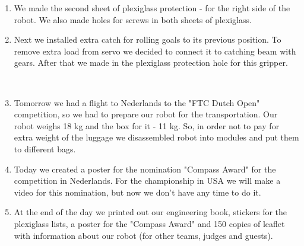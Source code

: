\begin{enumerate}
\begin{enumerate}
	   \item We made the second sheet of plexiglass protection - for the right side of the robot. We also made holes for screws in both sheets of plexiglass.
	   
	   \item Next we installed extra catch for rolling goals to its previous position. To remove extra load from servo we decided to connect it to catching beam with gears. After that we made in the plexiglass protection hole for this gripper.
	   \begin{figure}[H]
	   	\begin{minipage}[h]{0.2\linewidth}
	   		\center  
	   	\end{minipage}
	   	\begin{minipage}[h]{0.6\linewidth}
	   		\caption{}
	   	\end{minipage}
	   \end{figure}
	   
	   \item Tomorrow we had a flight to Nederlands to the "FTC Dutch Open" competition, so we had to prepare our robot for the transportation. Our robot weighs 18 kg and the box for it - 11 kg. So, in order not to pay for extra weight of the luggage we disassembled robot into modules and put them to different bags.
	   
	   \item Today we created a poster for the nomination "Compass Award" for the competition in Nederlands. For the championship in USA we will make a video for this nomination, but now we don't have any time to do it.
	   
	   \item At the end of the day we printed out our engineering book, stickers for the plexiglass lists, a poster for the "Compass Award" and 150 copies of leaflet with information about our robot (for other teams, judges and guests).


\end{enumerate}
\end{enumerate}
